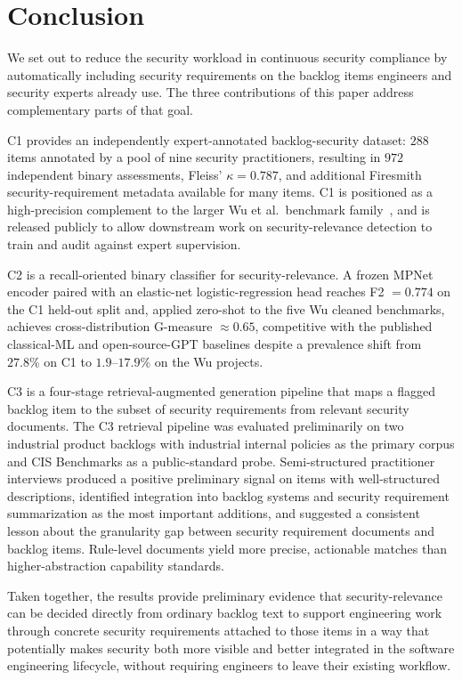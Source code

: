 \section{Conclusion}

We set out to reduce the security workload in continuous security compliance by automatically including security requirements on the backlog items engineers and security experts already use.
The three contributions of this paper address complementary parts of that goal.

C1 provides an independently expert-annotated backlog-security dataset: $288$ items annotated by a pool of nine security practitioners, resulting in $972$ independent binary assessments, Fleiss' $\kappa = 0.787$, and additional Firesmith security-requirement metadata available for many items.
C1 is positioned as a high-precision complement to the larger Wu et al.\ benchmark family~\cite{wu2022data-quality}, and is released publicly to allow downstream work on security-relevance detection to train and audit against expert supervision.

C2 is a recall-oriented binary classifier for security-relevance.
A frozen MPNet encoder paired with an elastic-net logistic-regression head reaches F2 $=0.774$ on the C1 held-out split and, applied zero-shot to the five Wu cleaned benchmarks, achieves cross-distribution G-measure $\approx 0.65$, competitive with the published classical-ML and open-source-GPT baselines despite a prevalence shift from $27.8\%$ on C1 to $1.9$--$17.9\%$ on the Wu projects.

C3 is a four-stage retrieval-augmented generation pipeline that maps a flagged backlog item to the subset of security requirements from relevant security documents.
The C3 retrieval pipeline was evaluated preliminarily on two industrial product backlogs with industrial internal policies as the primary corpus and CIS Benchmarks as a public-standard probe.
Semi-structured practitioner interviews produced a positive preliminary signal on items with well-structured descriptions, identified integration into backlog systems and security requirement summarization as the most important additions, and suggested a consistent lesson about the granularity gap between security requirement documents and backlog items.
Rule-level documents yield more precise, actionable matches than higher-abstraction capability standards.

Taken together, the results provide preliminary evidence that security-relevance can be decided directly from ordinary backlog text to support engineering work through concrete security requirements attached to those items in a way that potentially makes security both more visible and better integrated in the software engineering lifecycle, without requiring engineers to leave their existing workflow.

